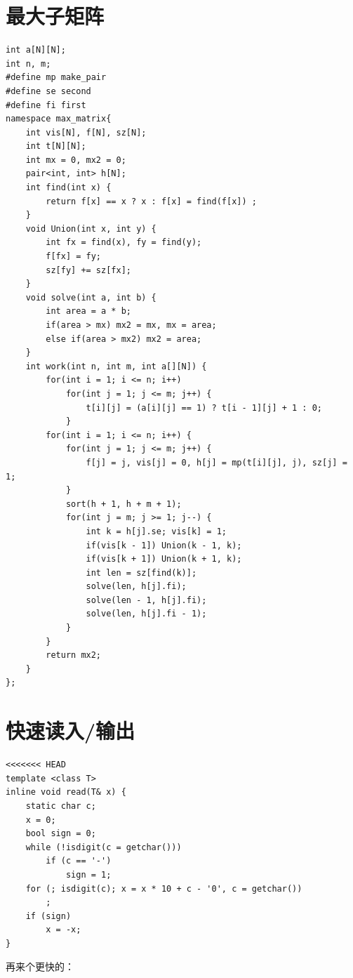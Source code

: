 \documentclass[a4paper,11pt,twoside,fontset = fandol,UTF8]{ctexbook} %
\begin{document}
	\section{最大子矩阵}
	\begin{lstlisting}
int a[N][N];
int n, m;
#define mp make_pair
#define se second
#define fi first
namespace max_matrix{
    int vis[N], f[N], sz[N];
    int t[N][N];
    int mx = 0, mx2 = 0;
    pair<int, int> h[N];
    int find(int x) {
        return f[x] == x ? x : f[x] = find(f[x]) ;
    }
    void Union(int x, int y) {
        int fx = find(x), fy = find(y);
        f[fx] = fy;
        sz[fy] += sz[fx];
    }
    void solve(int a, int b) {
        int area = a * b;
        if(area > mx) mx2 = mx, mx = area;
        else if(area > mx2) mx2 = area;
    }
    int work(int n, int m, int a[][N]) {
        for(int i = 1; i <= n; i++)
            for(int j = 1; j <= m; j++) {
                t[i][j] = (a[i][j] == 1) ? t[i - 1][j] + 1 : 0;
            }
        for(int i = 1; i <= n; i++) {
            for(int j = 1; j <= m; j++) {
                f[j] = j, vis[j] = 0, h[j] = mp(t[i][j], j), sz[j] = 1;
            }
            sort(h + 1, h + m + 1);
            for(int j = m; j >= 1; j--) {
                int k = h[j].se; vis[k] = 1;
                if(vis[k - 1]) Union(k - 1, k);
                if(vis[k + 1]) Union(k + 1, k);
                int len = sz[find(k)];
                solve(len, h[j].fi);
                solve(len - 1, h[j].fi);
                solve(len, h[j].fi - 1);
            }
        }
        return mx2;
    }
}; 
	\end{lstlisting}
	\section{快速读入/输出}
	\begin{lstlisting}
<<<<<<< HEAD
template <class T>
inline void read(T& x) {
    static char c;
    x = 0;
    bool sign = 0;
    while (!isdigit(c = getchar()))
        if (c == '-')
            sign = 1;
    for (; isdigit(c); x = x * 10 + c - '0', c = getchar())
        ;
    if (sign)
        x = -x;
}

	\end{lstlisting}
	
	再来个更快的：
	
\end{document}
